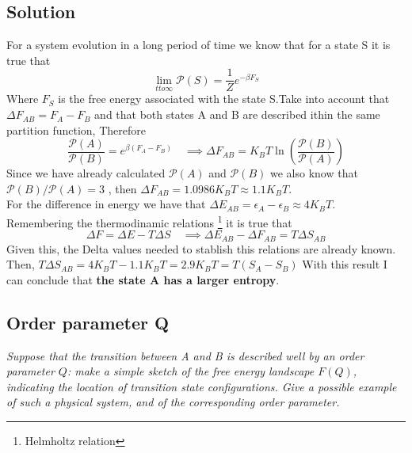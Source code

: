 \documentclass{article}
\begin{document}
\subsection*{Solution}
For a system evolution in a long period of time we know that for a state S it is true that 
\begin{equation}
    \lim_{t to \infty}\mathcal{P}(S) = \frac{1}{Z} e^{-\beta F_S} 
\end{equation}
Where $F_S$ is the  free energy associated with the state S.Take into account that $\Delta F_{AB} = F_A -F_B$ and that both states A and B are described ithin the same partition function, Therefore
\begin{equation}
    \frac{\mathcal{P}(A)}{\mathcal{P}(B)} = e^{\beta(F_A-F_B)} \quad \implies  \Delta F_{AB} = K_B T \ln{\left( \frac{\mathcal{P}(B)}{\mathcal{P}(A)}\right)}
\end{equation}
Since we have already calculated $\mathcal{P}(A)$ and $\mathcal{P}(B)$ we also know that $\mathcal{P}(B)/\mathcal{P}(A) = 3$ , then
$\Delta F_{AB} = 1.0986 K_B T \approx 1.1 K_B T$.\\
For the difference in energy we have that $\Delta E_{AB} = \epsilon_A -\epsilon_B \approx 4 K_B T$.\\
Remembering the thermodinamic relations \footnote{Helmholtz relation} it is true that
\begin{equation}
  \Delta F =  \Delta E- T \Delta S \quad \implies  \Delta E_{AB} - \Delta F_{AB} =  T \Delta S_{AB}
\end{equation}
Given this, the Delta values needed to stablish this relations are already known. Then, $T \Delta S_{AB} = 4K_B T - 1.1 K_B T = 2.9 K_B T = T (S_A - S_B)$
With this result I can conclude that \textbf{the state A has a larger entropy}.

\subsection{Order parameter Q}
\textit{Suppose that the transition between A and B is described well by an order parameter $Q$: make a simple sketch of the free energy landscape $F(Q)$, indicating the location of transition state configurations. Give a possible example of such a physical system, and of the corresponding order parameter.}
\end{document}
